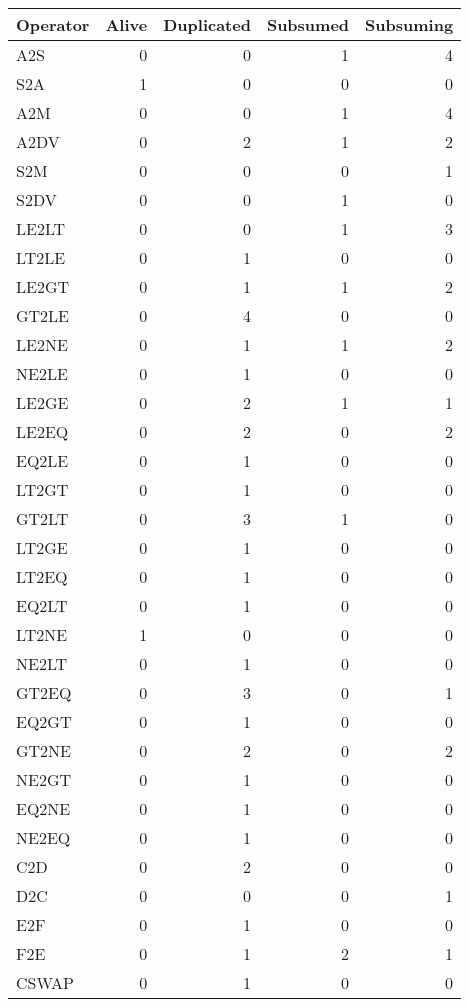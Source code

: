 \begin{tabular}{lrrrr}
    \toprule
    Operator & Alive & Duplicated & Subsumed & Subsuming \\
    \midrule
            A2S & 0 & 0 & 1 & 4 \\
            S2A & 1 & 0 & 0 & 0 \\
            A2M & 0 & 0 & 1 & 4 \\
            A2DV & 0 & 2 & 1 & 2 \\
            S2M & 0 & 0 & 0 & 1 \\
            S2DV & 0 & 0 & 1 & 0 \\
    \midrule
            LE2LT & 0 & 0 & 1 & 3 \\
            LT2LE & 0 & 1 & 0 & 0 \\
            LE2GT & 0 & 1 & 1 & 2 \\
            GT2LE & 0 & 4 & 0 & 0 \\
            LE2NE & 0 & 1 & 1 & 2 \\
            NE2LE & 0 & 1 & 0 & 0 \\
            LE2GE & 0 & 2 & 1 & 1 \\
            LE2EQ & 0 & 2 & 0 & 2 \\
            EQ2LE & 0 & 1 & 0 & 0 \\
            LT2GT & 0 & 1 & 0 & 0 \\
            GT2LT & 0 & 3 & 1 & 0 \\
            LT2GE & 0 & 1 & 0 & 0 \\
            LT2EQ & 0 & 1 & 0 & 0 \\
            EQ2LT & 0 & 1 & 0 & 0 \\
            LT2NE & 1 & 0 & 0 & 0 \\
            NE2LT & 0 & 1 & 0 & 0 \\
            GT2EQ & 0 & 3 & 0 & 1 \\
            EQ2GT & 0 & 1 & 0 & 0 \\
            GT2NE & 0 & 2 & 0 & 2 \\
            NE2GT & 0 & 1 & 0 & 0 \\
            EQ2NE & 0 & 1 & 0 & 0 \\
            NE2EQ & 0 & 1 & 0 & 0 \\
    \midrule
            C2D & 0 & 2 & 0 & 0 \\
            D2C & 0 & 0 & 0 & 1 \\
    \midrule
            E2F & 0 & 1 & 0 & 0 \\
            F2E & 0 & 1 & 2 & 1 \\
    \midrule
            CSWAP & 0 & 1 & 0 & 0 \\
    \bottomrule
\end{tabular}
